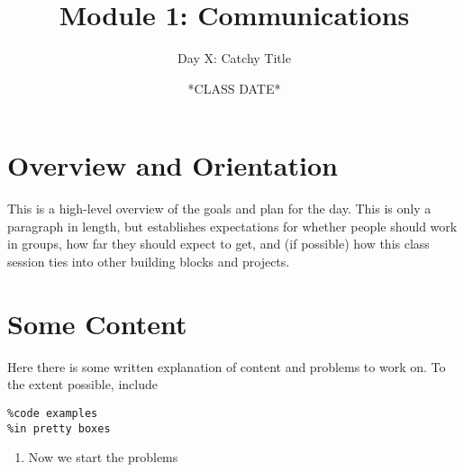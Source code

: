 \documentclass{tufte-handout}
\title{Module 1: Communications}
\author{Day X: Catchy Title}
\date{*CLASS DATE*}
\begin{document}
\maketitle

\vspace{0.1in}


\section{Overview and Orientation}
This is a high-level overview of the goals and plan for the day. This is only a paragraph in length, but establishes expectations for whether people should work in groups, how far they should expect to get, and (if possible) how this class session ties into other building blocks and projects.


\section{Some Content}

Here there is some written explanation of content and problems to work on. To the extent possible, include
\begin{lstlisting}
%code examples
%in pretty boxes
\end{lstlisting}

\begin{enumerate}
\item Now we start the problems
\end{enumerate}
\end{document}

